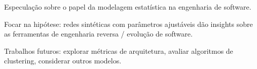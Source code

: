 \documentclass{acm_proc_article-sp}
\begin{document}
Especulação sobre o papel da modelagem estatística na engenharia de software.

Focar na hipótese: redes sintéticas com parâmetros ajustáveis dão insights sobre as ferramentas de engenharia reversa / evolução de software.




Trabalhos futuros: explorar métricas de arquitetura, avaliar algoritmos de clustering, considerar outros modelos.

%


\end{document}

